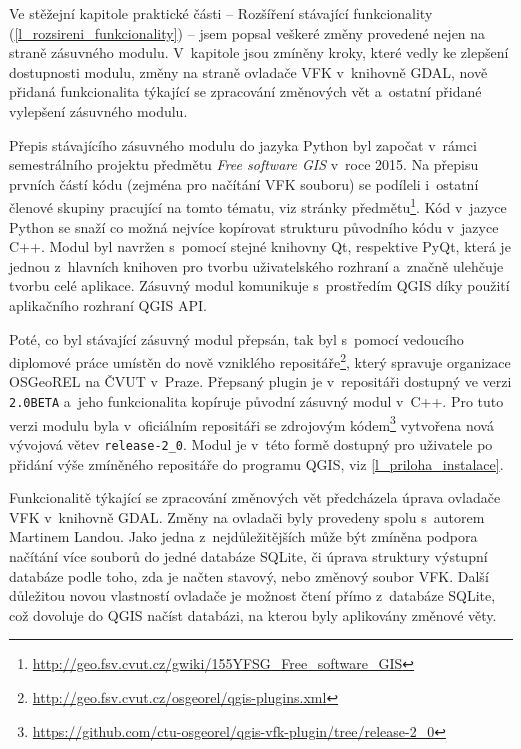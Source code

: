 \documentclass[a4paper,12pt,oneside]{book}
\begin{document}
Ve stěžejní kapitole praktické části -- Rozšíření stávající
funkcionality (\ref{l_rozsireni_funkcionality}) -- jsem popsal veškeré
změny provedené nejen na straně zásuvného modulu. V~kapitole jsou zmíněny kroky,
které vedly ke zlepšení dostupnosti modulu, změny na straně ovladače 
VFK v~knihovně GDAL, nově přidaná funkcionalita týkající se zpracování
změnových vět a~ostatní přidané vylepšení zásuvného modulu.

Přepis stávajícího zásuvného modulu do jazyka Python byl započat v~rámci
semestrálního projektu předmětu \textit{Free software GIS} v~roce 2015.
Na přepisu prvních částí kódu (zejména pro načítání VFK souboru) se podíleli
i~ostatní členové skupiny pracující na tomto tématu, viz stránky předmětu\footnote{\url{http://geo.fsv.cvut.cz/gwiki/155YFSG_Free_software_GIS}}.
Kód v~jazyce Python se snaží co možná nejvíce kopírovat strukturu původního kódu 
v~jazyce C++. Modul byl navržen s~pomocí stejné knihovny Qt, respektive PyQt, 
která je jednou z~hlavních knihoven pro tvorbu uživatelského rozhraní a~značně
ulehčuje tvorbu celé aplikace. Zásuvný modul komunikuje s~prostředím
QGIS díky použití aplikačního rozhraní QGIS API.

Poté, co byl stávající zásuvný modul přepsán, tak byl s~pomocí vedoucího 
diplo\-mové práce umístěn do nově vzniklého
repositáře\footnote{\url{http://geo.fsv.cvut.cz/osgeorel/qgis-plugins.xml}},
který spravuje organizace OSGeo\-REL na ČVUT v~Praze. Přepsaný plugin je v~repositáři
dostupný ve verzi \texttt{2.0BETA} a~jeho funkcionalita kopíruje
původní zásuvný modul v~C++. Pro tuto verzi modulu byla v~oficiálním
repositáři se zdrojovým
kódem\footnote{\url{https://github.com/ctu-osgeorel/qgis-vfk-plugin/tree/release-2_0}}
vytvořena nová vývojová větev \texttt{release-2\_0}. Modul je v~této
formě dostupný pro uživatele po přidání výše zmíněného repositáře do
programu QGIS, viz \ref{l_priloha_instalace}.

Funkcionalitě týkající se zpracování změnových vět předcházela úprava
ovladače VFK v~knihovně GDAL. Změny na ovladači byly provedeny spolu
s~autorem Martinem Landou. Jako jedna z~nejdůležitějších může být zmíněna 
podpora načítání více
souborů do jedné databáze SQLite, či úprava struktury výstupní
databáze podle toho, zda je načten stavový, nebo změnový soubor
VFK. Další důležitou novou vlastností ovladače je možnost čtení přímo
z~databáze SQLite, což dovoluje do QGIS načíst databázi, na kterou
byly aplikovány změnové věty.
\end{document}
